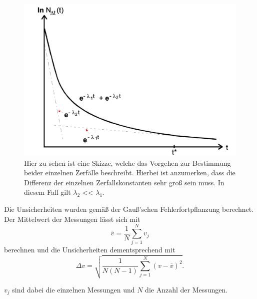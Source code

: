 \begin{figure}
    \centering
    \includegraphics[scale = 0.4]{content/Zerfall.pdf}
    \caption{Hier zu sehen ist eine Skizze, welche das Vorgehen zur Bestimmung beider einzelnen Zerfälle beschreibt. Hierbei ist anzumerken, dass die Differenz der einzelnen Zerfallskonstanten sehr groß sein muss. In diesem Fall gilt \(\lambda_2\) << \(\lambda_1\).}
    \label{fig:zerfall}
\end{figure}

Die Unsicherheiten wurden gemäß der Gauß'schen Fehlerfortpflanzung berechnet.
Der Mittelwert der Messungen lässt sich mit
\begin{equation}
    \overline{v}=\frac{1}{N} \sum_{j=1}^N v_j
\end{equation}
berechnen und die Unsicherheiten dementsprechend mit
\begin{equation}
    \Delta v = \sqrt{\frac{1}{N(N-1)} \sum_{j=1}^N (v-\overline{v})^2}.
\end{equation}

\(v_j\) sind dabei die einzelnen Messungen und \(N\) die Anzahl der Messungen.

